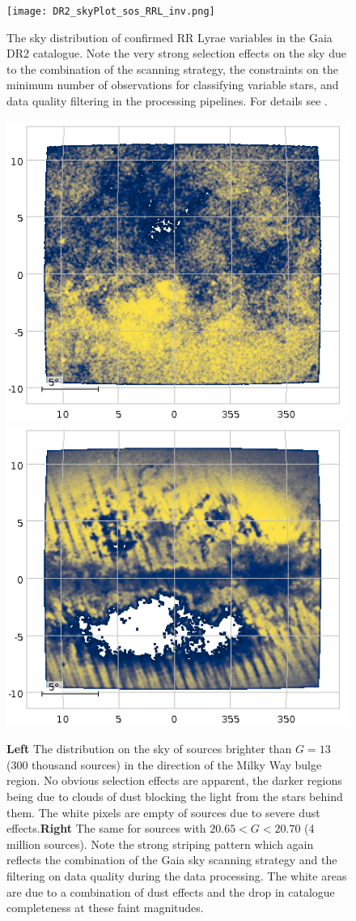 \begin{figure}
    \centering
    \texttt{[image: DR2\_skyPlot\_sos\_RRL\_inv.png]}
    \caption{The sky distribution of confirmed RR Lyrae variables in the Gaia DR2 catalogue. Note the very strong selection effects on the sky due to the combination of the scanning strategy, the constraints on the minimum number of observations for classifying variable stars, and data quality filtering in the processing pipelines. For details see \cite{2018A&A...618A..30H}.}
    \label{fig:rrl}
\end{figure}

\begin{figure}
    \centering
    \includegraphics[width=0.5\linewidth]{img/BulgeRegionGlt13.png}\hfil
    \includegraphics[width=0.5\linewidth]{img/BulgeRegionG20p65to20p70.png}
    \caption{\textbf{Left} The distribution on the sky of sources brighter than $G=13$ (300 thousand sources) in the direction of the Milky Way bulge region. No obvious selection effects are apparent, the darker regions being due to clouds of dust blocking the light from the stars behind them. The white pixels are empty of sources due to severe dust effects.\textbf{Right} The same for sources with $20.65<G<20.70$ (4 million sources). Note the strong striping pattern which again reflects the combination of the Gaia sky scanning strategy and the filtering on data quality during the data processing. The white areas are due to a combination of dust effects and the drop in catalogue completeness at these faint magnitudes.}
    \label{fig:bulge}
\end{figure}

